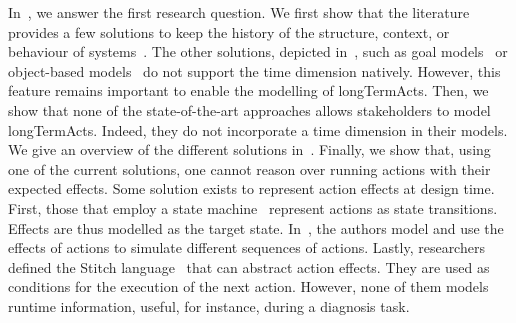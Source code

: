 In~, we answer the first research question.
We first show that the literature provides a few solutions to keep the history of the \gls{structure}, \gls{context}, or \gls{behaviour} of systems~\cite{DBLP:conf/seke/0001FNMKT14, DBLP:conf/models/0001FNMKBT14, 	DBLP:conf/dbpl/MoffittS17, DBLP:conf/icse/TaharaOH17, DBLP:conf/pervasive/HenricksenIR02, DBLP:conf/smartgridsec/0001FKNT14}.
The other solutions, depicted in~,  such as goal models~ \cite{DBLP:conf/icse/CailliauL17, DBLP:conf/icse/IftikharW14a, DBLP:conf/icse/MendoncaAR14, DBLP:conf/icse/ChenPYNZ14, DBLP:conf/re/BaresiPS10} or object-based models~\cite{DBLP:conf/pervasive/HenricksenIR02, DBLP:conf/smartgridsec/0001FKNT14, DBLP:conf/icse/TaharaOH17} do not support the time dimension natively.
However, this feature remains important to enable the modelling of \glspl{longTermAct}.
Then, we show that none of the state-of-the-art approaches allows stakeholders to model \glspl{longTermAct}.
Indeed, they do not incorporate a time dimension in their models.
We give an overview of the different solutions in~.
Finally, we show that, using one of the current solutions, one cannot reason over running actions with their expected effects.
Some solution exists to represent action effects at design time.
First, those that employ a state machine~\cite{DBLP:conf/sigsoft/MorenoCGS15, DBLP:conf/kbse/FilieriGLM11,DBLP:conf/wetice/DjoudiBZ14, DBLP:conf/aosd/ZhangGC09, DBLP:conf/icse/GhezziPST13, DBLP:conf/kbse/TajalliGEM10} represent actions as state transitions.
Effects are thus modelled as the target state.
In~\cite{DBLP:conf/smartgridsec/0001FKNT14}, the authors model and use the effects of actions to simulate different sequences of actions.
Lastly, researchers defined the Stitch language~\cite{DBLP:journals/jss/ChengG12} that can abstract action effects.
They are used as conditions for the execution of the next action.
However, none of them models runtime information, useful, for instance, during a diagnosis task.

